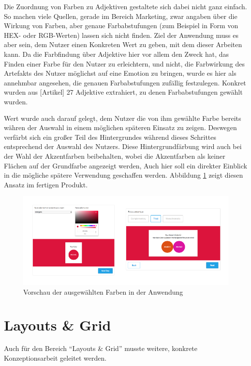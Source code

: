 Die Zuordnung von Farben zu Adjektiven gestaltete sich dabei nicht ganz einfach. So machen viele Quellen, gerade im Bereich Marketing, zwar angaben über die Wirkung von Farben, aber genaue Farbabstufungen (zum Beispiel in Form von HEX- oder RGB-Werten) lassen sich nicht finden.
Ziel der Anwendung muss es aber sein, dem Nutzer einen Konkreten Wert zu geben, mit dem dieser Arbeiten kann. Da die Farbfindung über Adjektive hier vor allem den Zweck hat, das Finden einer Farbe für den Nutzer zu erleichtern, und nicht, die Farbwirkung des Artefakts des Nutzer möglichst auf eine Emotion zu bringen, wurde es hier als annehmbar angesehen, die genauen Farbabstufungen zufällig festzulegen. Konkret wurden aus [Artikel] 27 Adjektive extrahiert, zu denen Farbabstufungen gewählt wurden.

Wert wurde auch darauf gelegt, dem Nutzer die von ihm gewählte Farbe bereits währen der Auswahl in einem möglichen späteren Einsatz zu zeigen. Deswegen verfärbt sich ein großer Teil des Hintergrundes während dieses Schrittes entsprechend der Auswahl des Nutzers. Diese Hintergrundfärbung wird auch bei der Wahl der Akzentfarben beibehalten, wobei die Akzentfarben als keiner Flächen auf der Grundfarbe angezeigt werden, Auch hier soll ein direkter Einblick in die mögliche spätere Verwendung geschaffen werden. Abbildung \ref{fig:colors_bg} zeigt diesen Ansatz im fertigen Produkt.

\begin{figure}[h]
    \centering
    \includegraphics[width=1\textwidth]{images/colors_background.png}
    \caption{Vorschau der ausgewählten Farben in der Anwendung}
    \label{fig:colors_bg}
\end{figure}

\section{Layouts \& Grid}

Auch für den Bereich “Layouts \& Grid” musste weitere, konkrete Konzeptionsarbeit geleitet werden.

